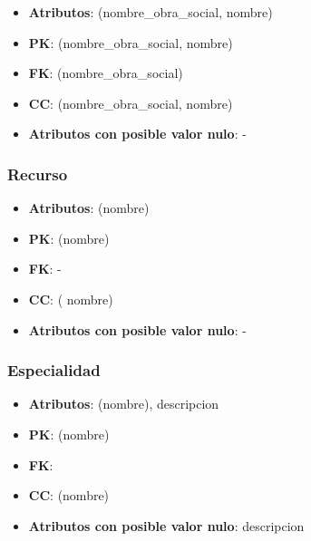 \documentclass[a4paper,11pt]{article}
\begin{document}
\begin{itemize}

\item 
\textbf{Atributos}: (nombre\_obra\_social, nombre)

\item 
\textbf{PK}: (nombre\_obra\_social, nombre)

\item
\textbf{FK}: (nombre\_obra\_social)

\item 
\textbf{CC}: (nombre\_obra\_social, nombre)

\item 
\textbf{Atributos con posible valor nulo}: -

\end{itemize}
\subsubsection{\textbf{Recurso}}

\begin{itemize}

\item 
\textbf{Atributos}: (nombre)

\item 
\textbf{PK}: (nombre)

\item
\textbf{FK}: -

\item 
\textbf{CC}: ( nombre)

\item 
\textbf{Atributos con posible valor nulo}: -

\end{itemize}
\subsubsection{\textbf{Especialidad}}

\begin{itemize}

\item 
\textbf{Atributos}: (nombre), descripcion

\item 
\textbf{PK}: (nombre)

\item
\textbf{FK}:

\item 
\textbf{CC}: (nombre)

\item 
\textbf{Atributos con posible valor nulo}: descripcion

\end{itemize}
\end{document}
